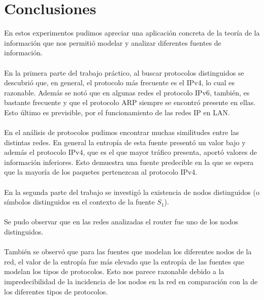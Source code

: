 \section{Conclusiones}
En estos experimentos pudimos apreciar una aplicación concreta de la teoría de la información que nos permitió modelar y analizar diferentes fuentes de información.
\\\\
En la primera parte del trabajo práctico, al buscar protocolos distinguidos se descubrió que, en general, el protocolo más frecuente es el IPv4, lo cual es razonable. Además se notó que en algunas redes el protocolo IPv6, también, es bastante frecuente y que el protocolo ARP siempre se encontró presente en ellas. Esto último es previsible, por el funcionamiento de las redes IP en LAN.
\\\\
En el análisis de protocolos pudimos encontrar muchas similitudes entre las distintas redes. En general la entropía de esta fuente presentó un valor bajo y además el protocolo IPv4, que es el que mayor tráfico presenta, aportó valores de información inferiores. Esto demuestra una fuente predecible en la que se espera que la mayoría de los paquetes pertenezcan al protocolo IPv4.
\\\\
En la segunda parte del trabajo se investigó la existencia de nodos distinguidos (o símbolos distinguidos en el contexto de la fuente $S_1$).
\\\\
Se pudo observar que en las redes analizadas el router fue uno de los nodos distinguidos.
\\\\
También se observó que para las fuentes que modelan los diferentes nodos de la red, el valor de la entropía fue más elevado que la entropía de las fuentes que modelan los tipos de protocolos. Esto nos parece razonable debido a la impredecibilidad de la incidencia de los nodos en la red en comparación con la de los diferentes tipos de protocolos.

